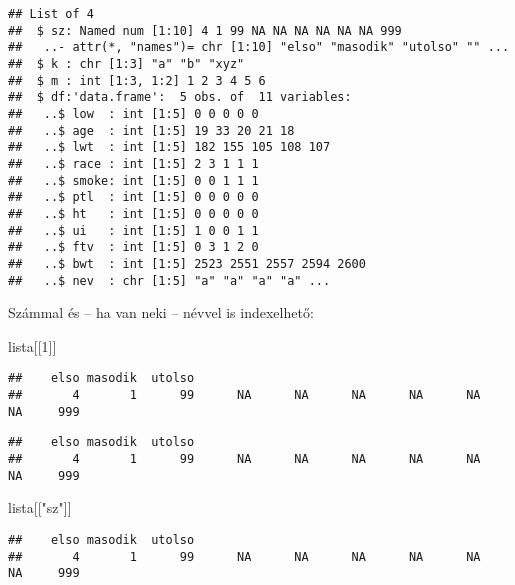 \documentclass[]{book}
\newenvironment{Shaded}{\begin{snugshade}}{\end{snugshade}}
\newcommand{\DecValTok}[1]{\textcolor[rgb]{0.00,0.00,0.81}{#1}}
\newcommand{\NormalTok}[1]{#1}
\newcommand{\OperatorTok}[1]{\textcolor[rgb]{0.81,0.36,0.00}{\textbf{#1}}}
\newcommand{\StringTok}[1]{\textcolor[rgb]{0.31,0.60,0.02}{#1}}
\begin{document}
\begin{verbatim}
## List of 4
##  $ sz: Named num [1:10] 4 1 99 NA NA NA NA NA NA 999
##   ..- attr(*, "names")= chr [1:10] "elso" "masodik" "utolso" "" ...
##  $ k : chr [1:3] "a" "b" "xyz"
##  $ m : int [1:3, 1:2] 1 2 3 4 5 6
##  $ df:'data.frame':  5 obs. of  11 variables:
##   ..$ low  : int [1:5] 0 0 0 0 0
##   ..$ age  : int [1:5] 19 33 20 21 18
##   ..$ lwt  : int [1:5] 182 155 105 108 107
##   ..$ race : int [1:5] 2 3 1 1 1
##   ..$ smoke: int [1:5] 0 0 1 1 1
##   ..$ ptl  : int [1:5] 0 0 0 0 0
##   ..$ ht   : int [1:5] 0 0 0 0 0
##   ..$ ui   : int [1:5] 1 0 0 1 1
##   ..$ ftv  : int [1:5] 0 3 1 2 0
##   ..$ bwt  : int [1:5] 2523 2551 2557 2594 2600
##   ..$ nev  : chr [1:5] "a" "a" "a" "a" ...
\end{verbatim}

Számmal és -- ha van neki -- névvel is indexelhető:

\begin{Shaded}
\begin{Highlighting}[]
\NormalTok{lista[[}\DecValTok{1}\NormalTok{]]}
\end{Highlighting}
\end{Shaded}

\begin{verbatim}
##    elso masodik  utolso                                                         
##       4       1      99      NA      NA      NA      NA      NA      NA     999
\end{verbatim}

\begin{Shaded}
\end{Shaded}

\begin{verbatim}
##    elso masodik  utolso                                                         
##       4       1      99      NA      NA      NA      NA      NA      NA     999
\end{verbatim}

\begin{Shaded}
\begin{Highlighting}[]
\NormalTok{lista[[}\StringTok{"sz"}\NormalTok{]]}
\end{Highlighting}
\end{Shaded}

\begin{verbatim}
##    elso masodik  utolso                                                         
##       4       1      99      NA      NA      NA      NA      NA      NA     999
\end{verbatim}
\end{document}
